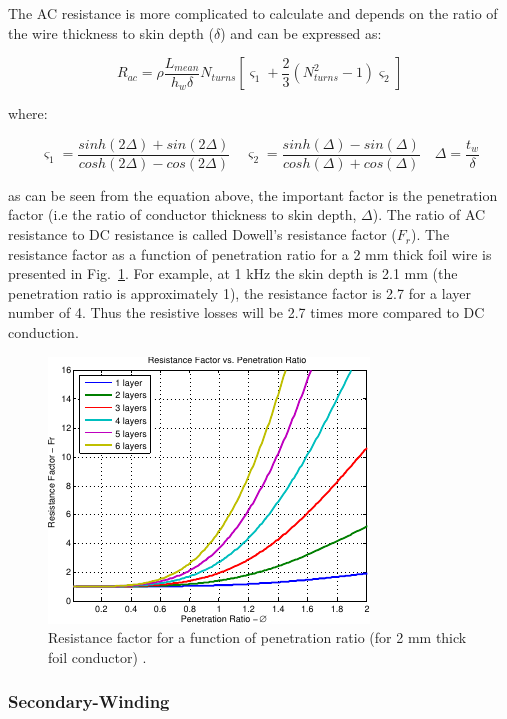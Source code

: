 \documentclass[a4paper, 11pt]{article} %
\begin{document}
The AC resistance is more complicated to calculate and depends on the ratio of the wire thickness to skin depth ($\delta$) and can be expressed as:

\begin{equation}
  R_{ac}=\rho \frac{L_{mean}}{h_w \delta} N_{turns} \left[\varsigma_1 + \frac{2}{3} (N_{turns}^2-1)\varsigma_2\right]
  \label{R_ac_foil}
\end{equation}

where:

\begin{equation}
  \varsigma_1 = \dfrac{sinh(2\Delta)+sin(2\Delta)}{cosh(2\Delta)-cos(2\Delta)} \quad
  \varsigma_2 = \dfrac{sinh(\Delta)-sin(\Delta)}{cosh(\Delta)+cos(\Delta)} \quad  
  \Delta = \dfrac{t_w}{\delta}
\end{equation}

as can be seen from the equation above,  the important factor is the penetration factor (i.e the ratio of conductor thickness to skin depth, $\Delta$). The ratio of AC resistance to DC resistance is called Dowell's resistance factor ($F_r$). The resistance factor as a function of penetration ratio for a 2 mm thick foil wire is presented in Fig.~\ref{resistance_factor}. For example, at 1 kHz the skin depth is 2.1 mm (the penetration ratio is approximately 1), the resistance factor is 2.7 for a layer number of 4. Thus the resistive losses will be 2.7 times more compared to DC conduction.

\begin{figure}[]
  \centering
    \includegraphics[scale=1.25]{resistance_factor}
  \caption{Resistance factor for a function of penetration ratio (for 2 mm thick foil conductor) \cite{Villar2010}.}
  \label{resistance_factor}
\end{figure}

\subsubsection{Secondary-Winding}
\end{document}
